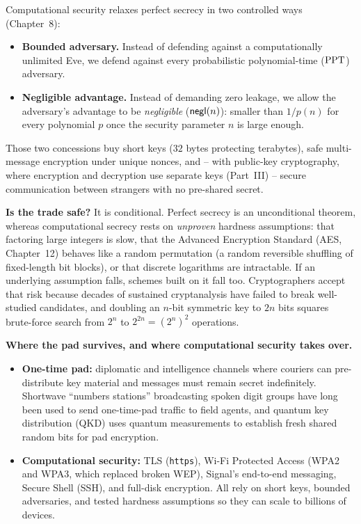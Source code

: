 \begin{focusbox}
Computational security relaxes perfect secrecy in two controlled ways (Chapter~8):
\begin{itemize}
  \item \textbf{Bounded adversary.} Instead of defending against a computationally unlimited Eve, we defend against every probabilistic polynomial-time ($\mathrm{PPT}$) adversary.
  \item \textbf{Negligible advantage.} Instead of demanding zero leakage, we allow the adversary's advantage to be \emph{negligible} ($\mathsf{negl}(n)$): smaller than $1/p(n)$ for every polynomial $p$ once the security parameter $n$ is large enough.
\end{itemize}
Those two concessions buy short keys ($32$ bytes protecting terabytes), safe multi-message encryption under unique nonces, and -- with public-key cryptography, where encryption and decryption use separate keys (Part~III) -- secure communication between strangers with no pre-shared secret.
\end{focusbox}

\begin{whybox}
\textbf{Is the trade safe?} It is conditional. Perfect secrecy is an unconditional theorem, whereas computational secrecy rests on \emph{unproven} hardness assumptions: that factoring large integers is slow, that the Advanced Encryption Standard (AES, Chapter~12) behaves like a random permutation (a random reversible shuffling of fixed-length bit blocks), or that discrete logarithms are intractable. If an underlying assumption falls, schemes built on it fall too. Cryptographers accept that risk because decades of sustained cryptanalysis have failed to break well-studied candidates, and doubling an $n$-bit symmetric key to $2n$ bits squares brute-force search from $2^n$ to $2^{2n} = (2^n)^2$ operations.
\end{whybox}

\begin{applicationbox}
\textbf{Where the pad survives, and where computational security takes over.}
\begin{itemize}
  \item \textbf{One-time pad:} diplomatic and intelligence channels where couriers can pre-distribute key material and messages must remain secret indefinitely. Shortwave ``numbers stations'' broadcasting spoken digit groups have long been used to send one-time-pad traffic to field agents, and quantum key distribution (QKD) uses quantum measurements to establish fresh shared random bits for pad encryption.
  \item \textbf{Computational security:} TLS (\texttt{https}), Wi-Fi Protected Access (WPA2 and WPA3, which replaced broken WEP), Signal's end-to-end messaging, Secure Shell (SSH), and full-disk encryption. All rely on short keys, bounded adversaries, and tested hardness assumptions so they can scale to billions of devices.
\end{itemize}
\end{applicationbox}

